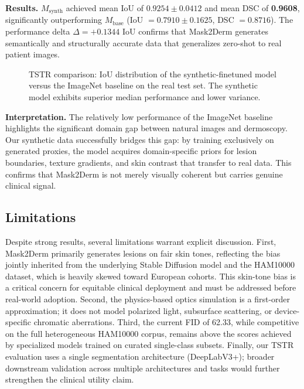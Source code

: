 \textbf{Results.} $M_\text{synth}$ achieved mean IoU of \textbf{$0.9254 \pm 0.0412$} and mean DSC of \textbf{0.9608}, significantly outperforming $M_\text{base}$ (IoU $= 0.7910 \pm 0.1625$, DSC $= 0.8716$). The performance delta $\Delta = +0.1344$ IoU confirms that Mask2Derm generates semantically and structurally accurate data that generalizes zero-shot to real patient images.

\begin{figure}[H]
    \centering
    \caption{TSTR comparison: IoU distribution of the synthetic-finetuned model versus the ImageNet baseline on the real test set. The synthetic model exhibits superior median performance and lower variance.}
    \label{fig:tstr_boxplot}
\end{figure}

\textbf{Interpretation.} The relatively low performance of the ImageNet baseline highlights the significant domain gap between natural images and dermoscopy. Our synthetic data successfully bridges this gap: by training exclusively on generated proxies, the model acquires domain-specific priors for lesion boundaries, texture gradients, and skin contrast that transfer to real data. This confirms that Mask2Derm is not merely visually coherent but carries genuine clinical signal.

\subsection{Limitations}

Despite strong results, several limitations warrant explicit discussion. First, Mask2Derm primarily generates lesions on fair skin tones, reflecting the bias jointly inherited from the underlying Stable Diffusion model and the HAM10000 dataset, which is heavily skewed toward European cohorts. This skin-tone bias is a critical concern for equitable clinical deployment and must be addressed before real-world adoption. Second, the physics-based optics simulation is a first-order approximation; it does not model polarized light, subsurface scattering, or device-specific chromatic aberrations. Third, the current FID of 62.33, while competitive on the full heterogeneous HAM10000 corpus, remains above the scores achieved by specialized models trained on curated single-class subsets. Finally, our TSTR evaluation uses a single segmentation architecture (DeepLabV3+); broader downstream validation across multiple architectures and tasks would further strengthen the clinical utility claim.
